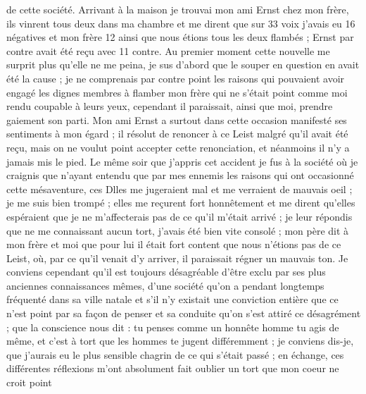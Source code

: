 \documentclass[12pt]{article}
\begin{document}
 de cette société. Arrivant à la maison je
trouvai mon ami Ernst chez mon frère, ils vinrent tous deux dans ma chambre et me dirent que sur 33
voix j’avais eu 16 négatives et mon frère 12 ainsi que nous étions tous les deux flambés ; Ernst par
contre avait été reçu avec 11 contre. Au premier moment cette nouvelle me surprit plus qu’elle ne me
peina, je sus d’abord que le souper en question en avait été la cause ; je ne comprenais par contre
point les raisons qui pouvaient avoir engagé les dignes membres à flamber mon frère qui ne s’était
point comme moi rendu coupable à leurs yeux, cependant il paraissait, ainsi que moi, prendre
gaiement son parti. Mon ami Ernst a surtout dans cette occasion manifesté ses sentiments à mon égard
; il résolut de renoncer à ce Leist malgré qu’il avait été reçu, mais on ne voulut point accepter
cette renonciation, et néanmoins il n’y a jamais mis le pied. Le même soir que j’appris cet accident
je fus à la société où je craignis que n’ayant entendu que par mes ennemis les raisons qui ont
occasionné cette mésaventure, ces Dlles me jugeraient mal et me verraient de mauvais oeil ; je me
suis bien trompé ; elles me reçurent fort honnêtement et me dirent qu’elles espéraient que je ne
m’affecterais pas de ce qu’il m’était arrivé ; je leur répondis que ne me connaissant aucun tort,
j’avais été bien vite consolé ; mon père dit à mon frère et moi que pour lui il était fort content
que nous n’étions pas de ce Leist, où, par ce qu’il venait d’y arriver, il paraissait régner un
mauvais ton. Je conviens cependant qu’il est toujours désagréable d’être exclu par ses plus
anciennes connaissances mêmes, d’une société qu’on a pendant longtemps fréquenté dans sa ville
natale et s’il n’y existait une conviction entière que ce n’est point par sa façon de penser et sa
conduite qu’on s’est attiré ce désagrément ; que la conscience nous dit : tu penses comme un honnête
homme tu agis de même, et c’est à tort que les hommes te jugent différemment ; je conviens dis-je,
que j’aurais eu le plus sensible chagrin de ce qui s’était passé ; en échange, ces différentes
réflexions m’ont absolument fait oublier un tort que mon coeur ne croit point
\end{document}

